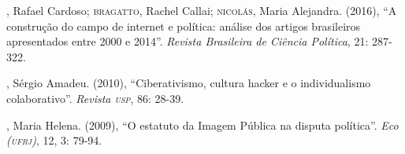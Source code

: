 \begin{bibliohedra}
, Rafael Cardoso; \textsc{bragatto}, Rachel Callai; \textsc{nicolás}, Maria
Alejandra. (2016), ``A construção do campo de internet e política:
análise dos artigos brasileiros apresentados entre 2000 e 2014''.
\emph{Revista Brasileira de Ciência Política}, 21: 287-322.

, Sérgio Amadeu. (2010), ``Ciberativismo, cultura hacker e o
individualismo colaborativo''. \emph{Revista \textsc{usp}}, 86: 28-39.

, Maria Helena. (2009), ``O estatuto da Imagem Pública na disputa
política''. \emph{Eco (\textsc{ufrj})}, 12, 3: 79-94.
\end{bibliohedra}